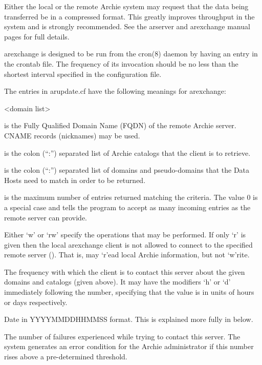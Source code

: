 Either the local or the remote Archie system may request that the data being
transferred be in a compressed format. This greatly improves throughput in the
system and is strongly recommended. See the arserver and arexchange manual
pages for full details.

arexchange is designed to be run from the cron(8) daemon by having an entry in the crontab file. The frequency of its invocation should be no less than the shortest interval specified in the configuration file.

The entries in arupdate.cf have the following meanings for arexchange:

\begin{TTentry}{<domain list>}

\item[<server host>]
is the Fully Qualified Domain Name (FQDN) of the remote Archie server. CNAME
records (nicknames) may be used.

\item[<db list>]
is the colon (``:'') separated list of Archie catalogs that the client is to
retrieve.

\item[<domain list>]
is the colon (``:'') separated list of domains and pseudo-domains that the
Data Hosts need to match in order to be returned.

\item[<max no>]
is the maximum number of entries returned matching the criteria. The value 0
is a special case and tells the program to accept as many incoming entries
as the remote server can provide.

\item[<perms>]
Either `w' or `rw' specify the operations that may be performed. If only `r'
is given then the local arexchange client is not allowed to connect to the
specified remote server (). That is, 
may `r'ead local
Archie information, but not `w'rite.

\item[<freq>]
The frequency with which the client is to contact this server about the given
domains and catalogs (given above). It may have the modifiers `h' or `d'
immediately following the number, specifying that the value is in units of
hours or days respectively.

\item[<date>]
Date in YYYYMMDDHHMMSS format. This is explained more fully in below.

\item[<fail>]
The number of failures experienced while trying to contact this server. The
system generates an error condition for the Archie administrator if this
number rises above a pre-determined threshold.

\end{TTentry}


